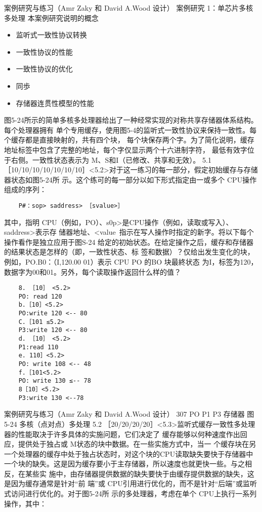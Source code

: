 案例研究与练习（Amr Zaky 和 David A.Wood 设计）
案例研究 1：单芯片多核多处理
本案例研究说明的概念
\begin{itemize}
    \item 监听式一致性协议转换
    \item 一致性协议的性能
    \item 一致性协议的优化
    \item 同歩
    \item 存储器连贯性模型的性能
\end{itemize}
图5-24所示的简单多核多处理器给出了一种经常实现的对称共享存储器体系结构。每个处理器拥有
单个专用缓存，使用图5-4的监听式一致性协议来保持一致性。每个缓存都是直接映射的，共有四个块，
每个块保存两个字。为了简化说明，缓存地址标签中包含了完整的地址，每个字仅显示两个十六进制字符，
最低有效字位于右侧。一致性状态表示为 M、S和I（已修改、共享和无效）。
5.1 ［10/10/10/10/10/10/10］<5.2>对于这一练习的每一部分，假定初始缓存与存储器状态如图5-24所
示。这个练可的每一部分以如下形式指定由一或多个 CPU操作组成的序列：
\begin{verbatim}
    P#：sop> saddress> ［svalue>］
\end{verbatim}
其中，指明 CPU（例如，PO）、s0p>是CPU操作（例如，读取或写入）、saddress>表示存
储器地址、<value~指示在写人操作时指定的新字。将以下每个操作看作是独立应用于图S-24
给定的初始状态。在给定操作之后，缓存和存储器的结果状态是怎样的（即，一致性状态、标
签和数据）？仅给出发生变化的块，例如，PO.B0：（I,120.00 01）表示 CPU PO 的BO 块最終状态
为I，标签为120，数据字为00和01。另外，每个读取操作返回什么样的值？
\begin{verbatim}
    8. ［10］ <5.2>
    PO: read 120
    b.［10］<5.2>
    PO:write 120 <-- 80
    C.［101 ≤5.2>
    P3:write 120 <-- 80
    d. ［10］ <5.2>
    P1:read 110
    e. 110］<5.2>
    PO: write 108 <-- 48
    f.［101<5.2>
    PO: write 130 ≤-- 78
    8［10］<5.2>
    P3:write 130 <--78
\end{verbatim}
案例研究与练习（Amr Zaky 和 David A.Wood 设计）
307
PO
P1
P3
存储器
图5-24 多核（点对点）多处理
5.2 ［20/20/20/20］<5.3>监听式缓存一致性多处理器的性能取决于许多具体的实施问题，它们决定了
缓存能够以何种速度作出回应，提供处于独占或 M状态的块中数据。在一些实施方式中，当一
个缓存块在另一个处理器的缓存中处于独占状态时，对这个块的CPU读取缺失要快于存储器中
一个块的缺失。这是因为缓存要小于主存储器，所以速度也就更快一些。与之相反，在某些实
施中，由存储器提供数据的缺失要快于由缓存提供数据的缺失，这是因为缓存通常是针对“前
端”或 CPU引用进行优化的，而不是针对“后端”或监听式访问进行优化的。对于图5-24所
示的多处理器，考虑在单个 CPU上执行一系列操作，其中：
